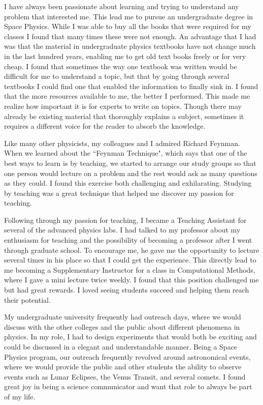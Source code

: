 \documentclass[12pt]{article}
\begin{document}
I have always been passionate about learning and trying to understand any
problem that interested me. This lead me to pursue an undergraduate degree in
Space Physics. While I was able to buy all the books that were required for my
classes I found that many times these were not enough. An advantage that I had
was that the material in undergraduate physics textbooks have not change much in
the last hundred years, enabling me to get old text books freely or for very
cheap. I found that sometimes the way one textbook was written would be
difficult for me to understand a topic, but that by going through several
textbooks I could find one that enabled the information to finally sink in. I
found that the more resources available to me, the better I performed. This made
me realize how important it is for experts to write on topics. Though there may
already be existing material that thoroughly explains a subject, sometimes it
requires a different voice for the reader to absorb the knowledge.

Like many other physicists, my colleagues and I admired Richard Feynman. When we
learned about the ``Feynman Technique", which says that one of the best ways to
learn is by teaching, we started to arrange our study groups so that one person
would lecture on a problem and the rest would ask as many questions as they
could. I found this exercise both challenging and exhilarating. Studying by
teaching was a great technique that helped me discover my passion for teaching.

Following through my passion for teaching, I became a Teaching Assistant for
several of the advanced physics labs. I had talked to my professor about my
enthusiasm for teaching and the possibility of becoming a professor after I went
through graduate school. To encourage me, he gave me the opportunity to lecture
several times in his place so that I could get the experience. This directly
lead to me becoming a Supplementary Instructor for a class in Computational
Methods, where I gave a mini lecture twice weekly. I found that this position
challenged me but had great rewards. I loved seeing students succeed and helping
them reach their potential. 

My undergraduate university frequently had outreach days, where we would discuss
with the other colleges and the public about different phenomena in physics. In
my role, I had to design experiments that would both be exciting and could be
discussed in a elegant and understandable manner. Being a Space Physics program,
our outreach frequently revolved around astronomical events, where we would
provide the public and other students the ability to observe events such as
Lunar Eclipses, the Venus Transit, and several comets. I found great joy in
being a science communicator and want that role to always be part of my life. 
\end{document}
